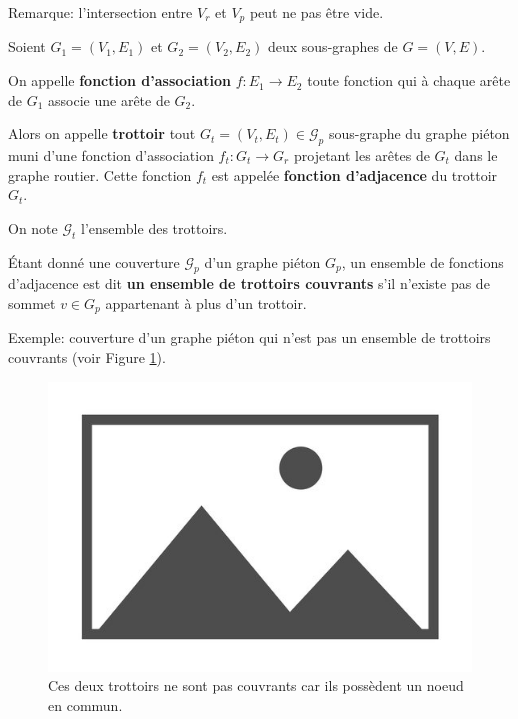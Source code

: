 \noindent
Remarque: l'intersection entre $V_r$ et $V_p$ peut ne pas être vide.

\begin{definition}
    Soient $G_1=(V_1, E_1)$ et $G_2=(V_2, E_2)$ deux sous-graphes de $G=(V, E)$.
    
    On appelle \textbf{fonction d'association} $f: E_1 \rightarrow E_2$ toute fonction qui à chaque arête de $G_1$ associe une arête de $G_2$.
\end{definition}

\begin{definition}
    Alors on appelle \textbf{trottoir} tout $G_t = (V_t, E_t)\in \mathcal{G}_p$ sous-graphe du graphe piéton muni d'une fonction d'association $f_t: G_t \rightarrow G_r$ projetant les arêtes de $G_t$ dans le graphe routier. Cette fonction $f_t$ est appelée \textbf{fonction d'adjacence} du trottoir $G_t$.

    On note $\mathcal{G}_t$ l'ensemble des trottoirs.
\end{definition}

\begin{definition}
    Étant donné une couverture $\mathcal{G}_p$ d'un graphe piéton $G_p$, un ensemble de fonctions d'adjacence est dit \textbf{un ensemble de trottoirs couvrants} s'il n'existe pas de sommet $v \in G_p$ appartenant à plus d'un trottoir.
\end{definition}

\noindent
Exemple: couverture d'un graphe piéton qui n'est pas un ensemble de trottoirs couvrants (voir Figure \ref{fig:mod_ex_trottoirs_couvrants}).

\begin{figure}
    \centering
    \includegraphics{images/placeholder.jpg}
    \caption{Ces deux trottoirs ne sont pas couvrants car ils possèdent un noeud en commun.}
    \label{fig:mod_ex_trottoirs_couvrants}
\end{figure}

